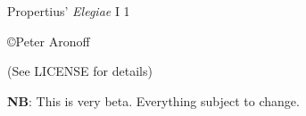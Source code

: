 \begin{titlepage}

\begin{center}

\huge Propertius' \textit{Elegiae} I 1

\vskip2in

\large \copyright Peter Aronoff \the\year

(See LICENSE for details)

\vskip1in

\textbf{NB}: This is very beta. Everything subject to change.

\vskip2in

\newpage

\end{center}

\end{titlepage}
